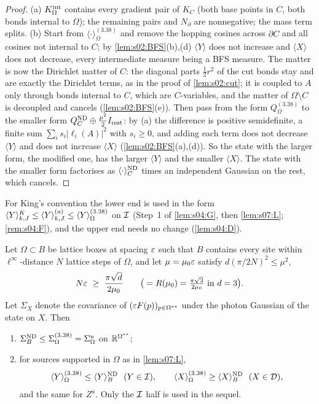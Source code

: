 \begin{proof}
(a) $K^{\rm int}_\Omega$ contains every gradient pair of $K_C$ (both base points in $C$, both bonds internal to $\Omega$); the remaining pairs and $N_\partial$ are nonnegative; the mass term splits. (b) Start from $\langle\cdot\rangle^{(3.38)}_\Omega$ and remove the hopping cosines across $\partial C$ and all cosines not internal to $C$; by \cref{lem:s02:BFS}(b),(d) $\langle Y\rangle$ does not increase and $\langle X\rangle$ does not decrease, every intermediate measure being a BFS measure. The matter is now the Dirichlet matter of $C$: the diagonal parts $\frac12r^2$ of the cut bonds stay and are exactly the Dirichlet terms, as in the proof of \cref{lem:s02:cut}; it is coupled to $A$ only through bonds internal to $C$, which are $C$-variables, and the matter of $\Omega\setminus C$ is decoupled and cancels (\cref{lem:s02:BFS}(e)). Then pass from the form $Q^{(3.38)}_\Omega$ to the smaller form $Q^{\mathrm{ND}}_C\oplus\frac{\mu^2}2I_{\rm rest}$: by (a) the difference is positive semidefinite, a finite sum $\sum_is_i|\ell_i(A)|^2$ with $s_i\ge0$, and adding each term does not decrease $\langle Y\rangle$ and does not increase $\langle X\rangle$ (\cref{lem:s02:BFS}(a),(d)). So the state with the larger form, the modified one, has the larger $\langle Y\rangle$ and the smaller $\langle X\rangle$. The state with the smaller form factorises as $\langle\cdot\rangle^{\mathrm{ND}}_C$ times an independent Gaussian on the rest, which cancels.
\end{proof}

For King's convention the lower end is used in the form $\langle Y\rangle^{K}_{k,J}\le\langle Y\rangle^{(a)}_{k,J}\le\langle Y\rangle^{(3.38)}_{\Omega}$ on $\mathcal I$ (Step~1 of \cref{lem:s04:G}, then \cref{lem:s07:L}; \cref{rem:s04:F}), and the upper end needs no change (\cref{lem:s04:D}).

\begin{lemma}\label{lem:s07:U}
Let $\Omega\subset B$ be lattice boxes at spacing $\varepsilon$ such that $B$ contains every site within $\ell^\infty$-distance $N$ lattice steps of $\Omega$, and let $\mu=\mu_0\varepsilon$ satisfy $d(\pi/2N)^2\le\mu^2$, \ie
\[
N\varepsilon\ \ge\ \frac{\pi\sqrt d}{2\mu_0}\qquad\big(=R(\mu_0)=\tfrac{\pi\sqrt3}{2\mu_0}\text{ in }d=3\big).
\]
Let $\Sigma_X$ denote the covariance of $(\varepsilon F(p))_{p\in\Omega^{**}}$ under the photon Gaussian of the state on $X$. Then
\begin{enumerate}[label=\textup{(\alph*)},nosep]
\item $\Sigma^{\mathrm{ND}}_B\le\Sigma^{(3.38)}_\Omega=\Sigma^u_\Omega$ on $\mathbb R^{\Omega^{**}}$;
\item for sources supported in $\Omega$ as in \cref{lem:s07:L},
\[
\langle Y\rangle^{(3.38)}_\Omega\le\langle Y\rangle^{\ND}_B\ \ (Y\in\cI),\qquad\langle X\rangle^{(3.38)}_\Omega\ge\langle X\rangle^{\ND}_B\ \ (X\in\cD),
\]
and the same for $Z^a$. Only the $\mathcal I$ half is used in the sequel.
\end{enumerate}
\end{lemma}

